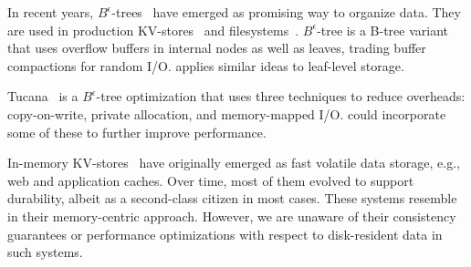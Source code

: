 In  recent years, $B^{\epsilon}$-trees~\cite{Brodal:2003:LBE:644108.644201} have emerged 
as promising way to organize data. They are used in production KV-stores~\cite{TokuDB} and filesystems~\cite{BetrFS}. 
$B^{\epsilon}$-tree is a B-tree variant that uses overflow buffers in internal nodes as well as leaves, trading buffer 
compactions for random I/O. \sys\/ applies similar ideas to leaf-level storage. 

Tucana~\cite{tucana} is a $B^{\epsilon}$-tree optimization that uses three techniques to reduce overheads: copy-on-write, 
private allocation, and memory-mapped I/O. \sys\/ could incorporate some of these to further improve performance. 

In-memory KV-stores~\cite{ignite, redis, memcached, Srinivasan:2016:AAR:3007263.3007276} have originally emerged as fast volatile 
data storage, e.g., web and application caches. Over time, most of them evolved to support durability,
albeit as a second-class citizen in most cases. 
These systems resemble \sys\/ in their memory-centric approach. 
However, we are unaware of their consistency guarantees or performance optimizations with respect  to disk-resident data in such systems. 

